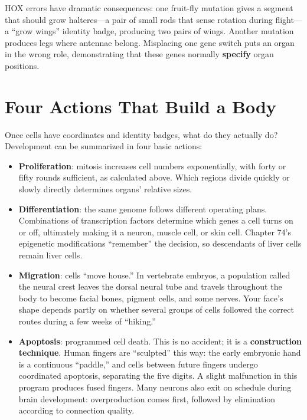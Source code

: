 HOX errors have dramatic consequences: one fruit-fly mutation gives a segment that should grow halteres---a pair of small rods that sense rotation during flight---a ``grow wings'' identity badge, producing two pairs of wings. Another mutation produces legs where antennae belong. Misplacing one gene switch puts an organ in the wrong role, demonstrating that these genes normally \textbf{specify} organ positions.

\section{Four Actions That Build a Body}

Once cells have coordinates and identity badges, what do they actually do? Development can be summarized in four basic actions:

\begin{itemize}[itemsep=2pt]
\item \textbf{Proliferation}: mitosis increases cell numbers exponentially, with forty or fifty rounds sufficient, as calculated above. Which regions divide quickly or slowly directly determines organs' relative sizes.
\item \textbf{Differentiation}: the same genome follows different operating plans. Combinations of transcription factors determine which genes a cell turns on or off, ultimately making it a neuron, muscle cell, or skin cell. Chapter 74's epigenetic modifications ``remember'' the decision, so descendants of liver cells remain liver cells.
\item \textbf{Migration}: cells ``move house.'' In vertebrate embryos, a population called the neural crest leaves the dorsal neural tube and travels throughout the body to become facial bones, pigment cells, and some nerves. Your face's shape depends partly on whether several groups of cells followed the correct routes during a few weeks of ``hiking.''
\item \textbf{Apoptosis}: programmed cell death. This is no accident; it is a \textbf{construction technique}. Human fingers are ``sculpted'' this way: the early embryonic hand is a continuous ``paddle,'' and cells between future fingers undergo coordinated apoptosis, separating the five digits. A slight malfunction in this program produces fused fingers. Many neurons also exit on schedule during brain development: overproduction comes first, followed by elimination according to connection quality.
\end{itemize}

